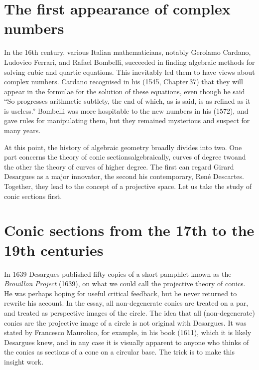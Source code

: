 \section{The first appearance of complex numbers}
In the 16th century, various Italian mathematicians, notably Gerolamo
Cardano,
%
Ludovico Ferrari,
%
and Rafael Bombelli,
%
succeeded in finding
algebraic methods for solving cubic and quartic equations. This inevitably
led them to have views about complex numbers.
%
 Cardano recognised in
his  (1545, Chapter\,37) that they will appear in the formulae for
the solution of these equations, even though he said ``So progresses
arithmetic subtlety, the end of which, as is said, is as refined as it is
useless.'' Bombelli was more hospitable to the new numbers in his  (1572),
and gave rules for manipulating them, but they remained mysterious and
suspect for many years.



At this point, the history of algebraic geometry broadly divides into
two. One part concerns the theory of conic sections\emdash algebraically,
curves of degree two\emdash and the other the theory of curves of higher
degree. The first can regard Girard Desargues
%
as a major innovator,
the second his contemporary,  Ren\'e Descartes.
%
Together, they lead
to the concept of a projective space. Let us take the study of conic
sections first.


\section{Conic sections from the 17th to the 19th centuries}
In 1639 Desargues published fifty copies of a short pamphlet known as
the \emph{Brouillon Project}
%
 (1639), on what we could call the
projective theory of conics. He was perhaps hoping for useful critical
feedback, but he never returned to rewrite his account.  In the essay,
all non-degenerate conics are treated on a par, and treated as
%
perspective images of the circle. The idea that all (non-degenerate)
conics are the projective image of a circle is not original with
Desargues. It was stated by Francesco Maurolico,
%
 for example, in his
book  (1611), which it is likely Desargues knew, and in any case it is
visually apparent to anyone who thinks of the conics as sections of a
cone on a circular base. The trick is to make this insight work.

